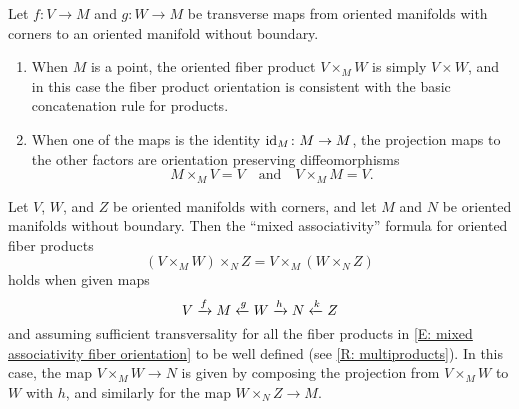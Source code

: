 \begin{proposition}\label{P: oriented fiber product basic properties}
	Let $f \colon V \to M$ and $g \colon W \to M$ be transverse maps from oriented manifolds with corners to an oriented manifold without boundary.
	\begin{enumerate}
		\item When $M$ is a point, the oriented fiber product $V \times_M W$ is simply $V \times W$, and in this case the fiber product orientation is consistent with the basic concatenation rule for products.
		\item When one of the maps is the identity $\mathrm{id}_M \colon M \to M$, the projection maps to the other factors are orientation preserving diffeomorphisms
		\begin{equation*}
			M \times_M V = V\quad\text{and}\quad V \times_M M = V.
		\end{equation*}
	\end{enumerate}
\end{proposition}

\begin{proposition}\label{P: oriented fiber mixed associativity}
	Let $V$, $W$, and $Z$ be oriented manifolds with corners, and let $M$ and $N$ be oriented manifolds without boundary.
	Then the ``mixed associativity'' formula for oriented fiber products
	\begin{equation}\label{E: mixed associativity fiber orientation}
		(V \times_M W) \times_N Z = V \times_M (W \times_N Z)
	\end{equation}
	holds when given maps
	$$V \xrightarrow{f} M\xleftarrow{g} W \xrightarrow{h} N\xleftarrow{k} Z$$
	and assuming sufficient transversality for all the fiber products in \eqref{E: mixed associativity fiber orientation} to be well defined (see \cref{R: multiproducts}).
	In this case, the map $V \times_M W \to N$ is given by composing the projection from $V \times_M W$ to $W$ with $h$, and similarly for the map $W \times_N Z \to M$.
\end{proposition}

